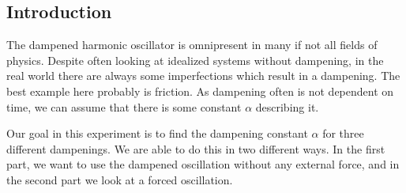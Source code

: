 \subsection{Introduction}

The dampened harmonic oscillator is omnipresent in many if not all fields of physics. 
Despite often looking at idealized systems without dampening, in the real world there are always some imperfections which result in a dampening.
The best example here probably is friction. 
As dampening often is not dependent on time, we can assume that there is some constant $\alpha$ describing it.

Our goal in this experiment is to find the dampening constant $\alpha$ for three different dampenings.
We are able to do this in two different ways. 
In the first part, we want to use the dampened oscillation without any external force, and in the second part we look at a forced oscillation.

